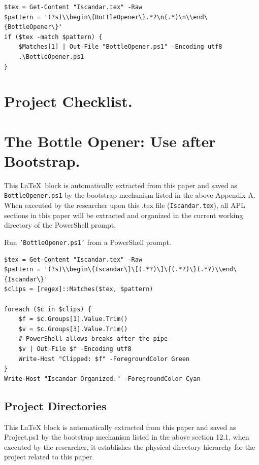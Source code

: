 \documentclass[11pt]{article}
\begin{document}
\begin{verbatim}
$tex = Get-Content "Iscandar.tex" -Raw
$pattern = '(?s)\\begin\{BottleOpener\}.*?\n(.*)\n\\end\{BottleOpener\}'
if ($tex -match $pattern) {
    $Matches[1] | Out-File "BottleOpener.ps1" -Encoding utf8
    .\BottleOpener.ps1
}
\end{verbatim}

\section {Project Checklist.}

\section{The Bottle Opener: Use after Bootstrap.}
This \LaTeX\ block is automatically extracted from this paper and saved as \texttt{BottleOpener.ps1} by the bootstrap mechanism listed in the above Appendix A. When executed by the researcher upon this .tex file (\texttt{Iscandar.tex}), all APL sections in this paper will be extracted and organized in the current working directory of the PowerShell prompt.

Run \texttt{'BottleOpener.ps1'} from a PowerShell prompt.

\begin{verbatim}
$tex = Get-Content "Iscandar.tex" -Raw
$pattern = '(?s)\\begin\{Iscandar\}\[(.*?)\]\{(.*?)\}(.*?)\\end\{Iscandar\}'
$clips = [regex]::Matches($tex, $pattern)

foreach ($c in $clips) {
    $f = $c.Groups[1].Value.Trim()
    $v = $c.Groups[3].Value.Trim()
    # PowerShell allows breaks after the pipe
    $v | Out-File $f -Encoding utf8
    Write-Host "Clipped: $f" -ForegroundColor Green
}
Write-Host "Iscandar Organized." -ForegroundColor Cyan
\end{verbatim}

\subsection{Project Directories}
This \LaTeX{} block is automatically extracted from this paper and saved as Project.ps1 by the bootstrap mechanism listed in the above section 12.1, when executed by the researcher, it establishes the physical directory hierarchy for the project related to this paper.
\end{document}
